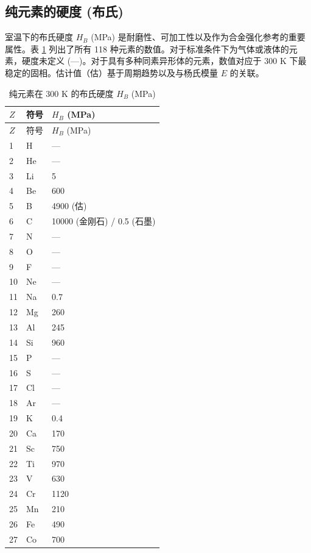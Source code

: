 \documentclass[12pt,a4paper]{article}
\begin{document}
	\subsection{纯元素的硬度 (布氏)}
	\label{subsec:hardness}
	
	室温下的布氏硬度 \(H_B\) (MPa) 是耐磨性、可加工性以及作为合金强化参考的重要属性。表 \ref{tab:hardness-all} 列出了所有 118 种元素的数值。对于标准条件下为气体或液体的元素，硬度未定义 (—)。对于具有多种同素异形体的元素，数值对应于 300 K 下最稳定的固相。估计值（估）基于周期趋势以及与杨氏模量 \(E\) 的关联。
	
	\begin{longtable}{p{0.6cm}p{1.2cm}p{2.5cm}}
		\caption{纯元素在 300 K 的布氏硬度 \(H_B\) (MPa)} \label{tab:hardness-all} \\
		\toprule
		\(Z\) & 符号 & \(H_B\) (MPa) \\
		\midrule
		\endfirsthead
		\toprule
		\(Z\) & 符号 & \(H_B\) (MPa) \\
		\midrule
		\endhead
		1  & H  & — \\
		2  & He & — \\
		3  & Li & 5 \\
		4  & Be & 600 \\
		5  & B  & 4900 (估) \\
		6  & C  & 10000 (金刚石) / 0.5 (石墨) \\
		7  & N  & — \\
		8  & O  & — \\
		9  & F  & — \\
		10 & Ne & — \\
		11 & Na & 0.7 \\
		12 & Mg & 260 \\
		13 & Al & 245 \\
		14 & Si & 960 \\
		15 & P  & — \\
		16 & S  & — \\
		17 & Cl & — \\
		18 & Ar & — \\
		19 & K  & 0.4 \\
		20 & Ca & 170 \\
		21 & Sc & 750 \\
		22 & Ti & 970 \\
		23 & V  & 630 \\
		24 & Cr & 1120 \\
		25 & Mn & 210 \\
		26 & Fe & 490 \\
		27 & Co & 700 \\

\end{longtable}
\end{document}
